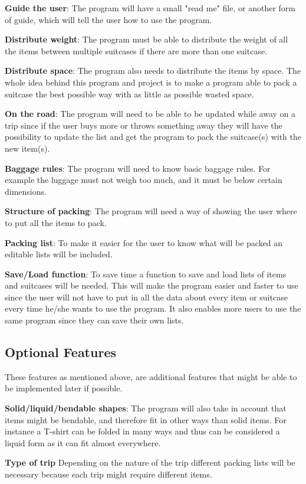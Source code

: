 \textbf{Guide the user}:
The program will have a small "read me" file, or another form of guide, which will tell the user how to use the program.
\newline

\textbf{Distribute weight}:
The program must be able to distribute the weight of all the items between multiple suitcases if there are more than one suitcase.
\newline

\textbf{Distribute space}:
The program also needs to distribute the items by space. The whole idea behind this program and project is to make a program able to pack a suitcase the best possible way with as little as possible wasted space.
\newline

\textbf{On the road}:
The program will need to be able to be updated while away on a trip since if the user buys more or throws something away they will have the possibility to update the list and get the program to pack the suitcase(s) with the new item(s).
\newline

\textbf{Baggage rules}:
The program will need to know basic baggage rules. For example the luggage must not weigh too much, and it must be below certain dimensions.
\newline

\textbf{Structure of packing}:
The program will need a way of showing the user where to put all the items to pack.
\newline

\textbf{Packing list}:
To make it easier for the user to know what will be packed an editable lists will be included.
\newline

\textbf{Save/Load function}:
To save time a function to save and load lists of items and suitcases will be needed. This will make the program easier and faster to use since the user will not have to put in all the data about every item or suitcase every time he/she wants to use the program. It also enables more users to use the same program since they can save their own lists.
\newline

\subsection{Optional Features}
These features as mentioned above, are additional features that might be able to be implemented later if possible.\newline

\textbf{Solid/liquid/bendable shapes}:
The program will also take in account that items might be bendable, and therefore fit in other ways than solid items. For instance a T-shirt can be folded in many ways and thus can be considered a liquid form as it can fit almost everywhere.
\newline

\textbf{Type of trip}
Depending on the nature of the trip different packing lists will be necessary because each trip might require different items.
\newline
